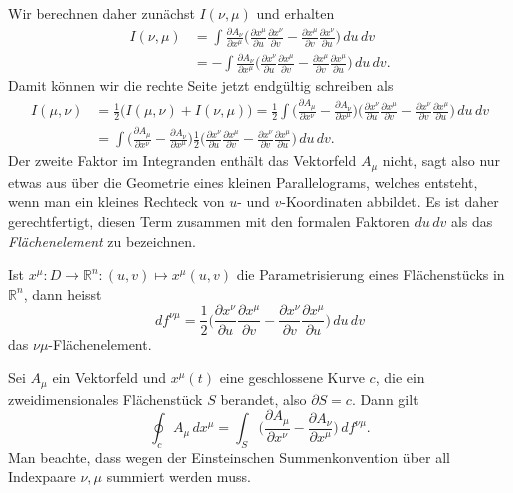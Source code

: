 Wir berechnen daher zunächst $I(\nu,\mu)$ und erhalten
\begin{align*}
I(\nu,\mu)
&=
\int
\frac{\partial A_\nu}{\partial x^\mu}
\biggl(\frac{\partial x^\mu}{\partial u}\frac{\partial x^\nu}{\partial v}
-
\frac{\partial x^\mu}{\partial v}\frac{\partial x^\nu}{\partial u}
\biggr)
\,du\,dv
\\
&=
-
\int
\frac{\partial A_\nu}{\partial x^\mu}
\biggl(\frac{\partial x^\nu}{\partial u}\frac{\partial x^\mu}{\partial v}
-
\frac{\partial x^\mu}{\partial v}\frac{\partial x^\mu}{\partial u}
\biggr)
\,du\,dv.
\end{align*}
Damit können wir die rechte Seite jetzt endgültig schreiben als
\begin{align*}
I(\mu,\nu)
&=
\frac12\biggl( I(\mu,\nu)+I(\nu,\mu)\biggr)
=
\frac12
\int
\biggl(
\frac{\partial A_\mu}{\partial x^\nu}
-
\frac{\partial A_\nu}{\partial x^\mu}
\biggr)
\biggl(
\frac{\partial x^\nu}{\partial u}\frac{\partial x^\mu}{\partial v}
-
\frac{\partial x^\nu}{\partial v}\frac{\partial x^\mu}{\partial u}
\biggr)
\,du\,dv
\\
&=
\int
\biggl(
\frac{\partial A_\mu}{\partial x^\nu}
-
\frac{\partial A_\nu}{\partial x^\mu}
\biggr)
\frac12
\biggl(
\frac{\partial x^\nu}{\partial u}\frac{\partial x^\mu}{\partial v}
-
\frac{\partial x^\nu}{\partial v}\frac{\partial x^\mu}{\partial u}
\biggr)
\,du\,dv.
\end{align*}
Der zweite Faktor im Integranden enthält das Vektorfeld $A_\mu$ nicht,
sagt also nur etwas aus über die Geometrie eines kleinen Parallelograms,
welches entsteht, wenn man ein kleines Rechteck von $u$- und $v$-Koordinaten
abbildet.
Es ist daher gerechtfertigt, diesen Term zusammen mit den formalen
Faktoren $du\,dv$ als das {\em Flächenelement} zu bezeichnen.
%
\begin{definition}
Ist $x^\mu\colon D\to\mathbb R^n:(u,v)\mapsto x^\mu(u,v)$ die Parametrisierung
eines Flächenstücks in $\mathbb R^n$, dann heisst 
\[
df^{\nu\mu}
=
\frac12
\biggl(
\frac{\partial x^\nu}{\partial u}\frac{\partial x^\mu}{\partial v}
-
\frac{\partial x^\nu}{\partial v}\frac{\partial x^\mu}{\partial u}
\biggr)
\,du\,dv
\]
das $\nu\mu$-Flächenelement.
\end{definition}

\begin{satz}[Stokes]
Sei $A_\mu$ ein Vektorfeld und $x^\mu(t)$ eine geschlossene Kurve $c$,
die ein zweidimensionales Flächenstück $S$ berandet, also $\partial S=c$.
Dann gilt
\[
\oint_c A_\mu\,dx^\mu
=
\int_S \biggl(
\frac{\partial A_\mu}{\partial x^\nu}-\frac{\partial A_\nu}{\partial x^\mu}
\biggr) \,df^{\nu\mu}.
\]
Man beachte, dass wegen der Einsteinschen Summenkonvention über all
Indexpaare $\nu,\mu$ summiert werden muss.
\end{satz}
%

